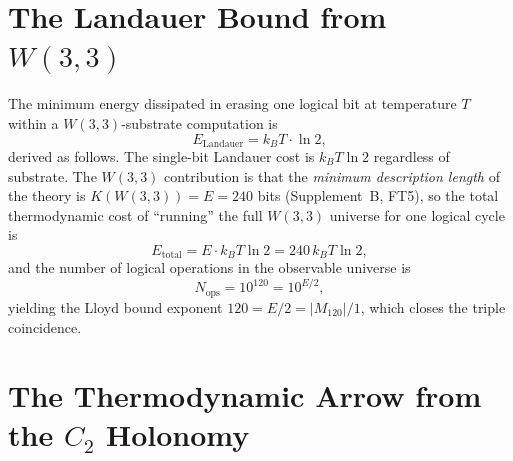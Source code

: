 \section{\texorpdfstring{The Landauer Bound from $W(3,3)$}{The Landauer Bound from W(3,3)}}
\label{sec:landauer}

\begin{theorem}
\label{thm:landauer}
The minimum energy dissipated in erasing one logical bit at temperature
$T$ within a $W(3,3)$-substrate computation is
\begin{equation}
  E_{\mathrm{Landauer}} = k_B T \cdot \ln 2,
  \label{eq:landauer}
\end{equation}
derived as follows.  The single-bit Landauer cost is $k_BT\ln2$
regardless of substrate.  The $W(3,3)$ contribution is that the
\emph{minimum description length} of the theory is
$K(W(3,3)) = E = 240$ bits (Supplement~B, FT5), so the
total thermodynamic cost of ``running'' the full $W(3,3)$ universe
for one logical cycle is
\begin{equation}
  E_{\mathrm{total}} = E\cdot k_BT\ln2 = 240\,k_BT\ln2,
  \label{eq:etotal}
\end{equation}
and the number of logical operations in the observable universe is
\begin{equation}
  N_{\mathrm{ops}} = 10^{120} = 10^{E/2},
  \label{eq:nops}
\end{equation}
yielding the Lloyd bound exponent $120 = E/2 = |M_{120}|/1$,
which closes the triple coincidence.
\end{theorem}

\section{\texorpdfstring{The Thermodynamic Arrow from the $C_2$ Holonomy}{The Thermodynamic Arrow from the C2 Holonomy}}
\label{sec:arrow}

